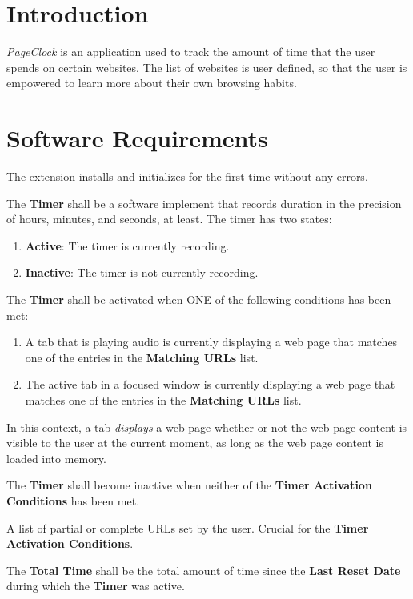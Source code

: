 \documentclass{designdoc}
\begin{document}
\section{Introduction}
\textit{PageClock} is an application used to track the amount of time that the
user spends on certain websites. The list of websites is user defined, so that
the user is empowered to learn more about their own browsing habits.

\section{Software Requirements}
The extension installs and initializes for the first time without any errors.

The \textbf{Timer} shall be a software implement that records duration in the
precision of hours, minutes, and seconds, at least. The timer has two states:
\begin{enumerate}
\item \textbf{Active}: The timer is currently recording.
\item \textbf{Inactive}: The timer is not currently recording.
\end{enumerate}

The \textbf{Timer} shall be activated when ONE of the following conditions has
been met:
\begin{enumerate}
\item A tab that is playing audio is currently displaying a web page that
  matches one of the entries in the \textbf{Matching URLs} list.
\item The active tab in a focused window is currently displaying a web page
  that matches one of the entries in the \textbf{Matching URLs} list.
\end{enumerate}
In this context, a tab \textit{displays} a web page whether or not the web page
content is visible to the user at the current moment, as long as the web page
content is loaded into memory.

The \textbf{Timer} shall become inactive when neither of the \textbf{Timer
  Activation Conditions} has been met.

A list of partial or complete URLs set by the user. Crucial for the
\textbf{Timer Activation Conditions}.

The \textbf{Total Time} shall be the total amount of time since the
\textbf{Last Reset Date} during which the \textbf{Timer} was active.
\end{document}
